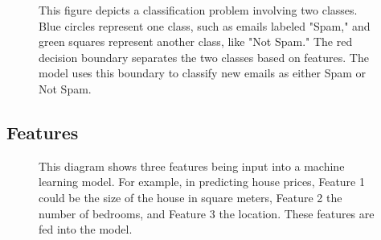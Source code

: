 \documentclass{article}
\begin{document}
\begin{figure}[H]
\centering
{}
    \caption{This figure depicts a classification problem involving two classes. Blue circles represent one class, such as emails labeled "Spam," and green squares represent another class, like "Not Spam." The red decision boundary separates the two classes based on features. The model uses this boundary to classify new emails as either Spam or Not Spam.}
    \label{fig:regression_example}
\end{figure}

\subsection{Features}

\begin{figure}[H]
\centering
{}
    \caption{This diagram shows three features being input into a machine learning model. For example, in predicting house prices, Feature 1 could be the size of the house in square meters, Feature 2 the number of bedrooms, and Feature 3 the location. These features are fed into the model.}
    \label{fig:regression_example}
\end{figure}
\end{document}

